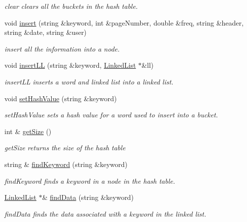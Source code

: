 \begin{DoxyCompactItemize}
\begin{DoxyCompactList}\small\item\em clear clears all the buckets in the hash table. \end{DoxyCompactList}\item 
void \hyperlink{class_hash_table_a3a194bb56855eb892b24455094a1edbb}{insert} (string \&keyword, int \&page\-Number, double \&freq, string \&header, string \&date, string \&user)
\begin{DoxyCompactList}\small\item\em insert all the information into a node. \end{DoxyCompactList}\item 
void \hyperlink{class_hash_table_a096c63eedf8e85a5523d59929f7a7cb3}{insert\-L\-L} (string \&keyword, \hyperlink{class_linked_list}{Linked\-List} $\ast$\&ll)
\begin{DoxyCompactList}\small\item\em insert\-L\-L inserts a word and linked list into a linked list. \end{DoxyCompactList}\item 
void \hyperlink{class_hash_table_afc9f7516810e364c4a8ebed516cd6406}{set\-Hash\-Value} (string \&keyword)
\begin{DoxyCompactList}\small\item\em set\-Hash\-Value sets a hash value for a word used to insert into a bucket. \end{DoxyCompactList}\item 
int \& \hyperlink{class_hash_table_a1968cb702792b31d8b259ce4b945543f}{get\-Size} ()
\begin{DoxyCompactList}\small\item\em get\-Size returns the size of the hash table \end{DoxyCompactList}\item 
string \& \hyperlink{class_hash_table_ab7d96c3bdf0871e7aec5c3fa71a6455c}{find\-Keyword} (string \&keyword)
\begin{DoxyCompactList}\small\item\em find\-Keyword finds a keyword in a node in the hash table. \end{DoxyCompactList}\item 
\hyperlink{class_linked_list}{Linked\-List} $\ast$\& \hyperlink{class_hash_table_a416e1aae0ecadc989c72d0e6b340a8a8}{find\-Data} (string \&keyword)
\begin{DoxyCompactList}\small\item\em find\-Data finds the data associated with a keyword in the linked list. \end{DoxyCompactList}\end{DoxyCompactItemize}


